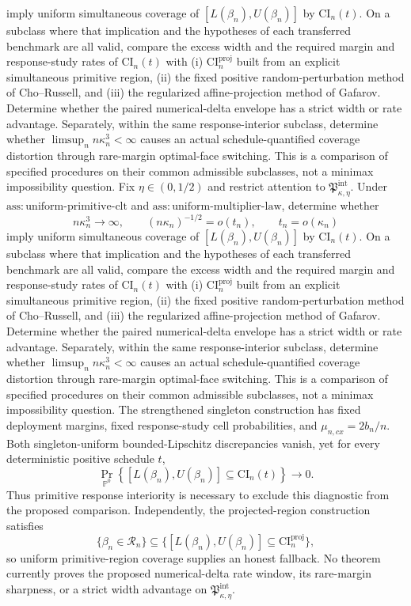 imply uniform simultaneous coverage of \([L(\beta_n),U(\beta_n)]\) by \(\mathrm{CI}_n(t)\).  On a subclass where that implication and the hypotheses of each transferred benchmark are all valid, compare the excess width and the required margin and response-study rates of \(\mathrm{CI}_n(t)\) with (i) \(\mathrm{CI}_n^{\mathrm{proj}}\) built from an explicit simultaneous primitive region, (ii) the fixed positive random-perturbation method of Cho--Russell, and (iii) the regularized affine-projection method of Gafarov.  Determine whether the paired numerical-delta envelope has a strict width or rate advantage.  Separately, within the same response-interior subclass, determine whether \(\limsup_n n\kappa_n^3<\infty\) causes an actual schedule-quantified coverage distortion through rare-margin optimal-face switching.  This is a comparison of specified procedures on their common admissible subclasses, not a minimax impossibility question.
Fix \(\eta\in(0,1/2)\) and restrict attention to \(\mathfrak P_{\kappa,\eta}^{\mathrm{int}}\).  Under \(\mathrm{ass:uniform\text{-}primitive\text{-}clt}\) and \(\mathrm{ass:uniform\text{-}multiplier\text{-}law}\), determine whether
\[
n\kappa_n^3\to\infty,
\qquad
(n\kappa_n)^{-1/2}=o(t_n),
\qquad
t_n=o(\kappa_n)
\]
imply uniform simultaneous coverage of \([L(\beta_n),U(\beta_n)]\) by \(\mathrm{CI}_n(t)\).  On a subclass where that implication and the hypotheses of each transferred benchmark are all valid, compare the excess width and the required margin and response-study rates of \(\mathrm{CI}_n(t)\) with (i) \(\mathrm{CI}_n^{\mathrm{proj}}\) built from an explicit simultaneous primitive region, (ii) the fixed positive random-perturbation method of Cho--Russell, and (iii) the regularized affine-projection method of Gafarov.  Determine whether the paired numerical-delta envelope has a strict width or rate advantage.  Separately, within the same response-interior subclass, determine whether \(\limsup_n n\kappa_n^3<\infty\) causes an actual schedule-quantified coverage distortion through rare-margin optimal-face switching.  This is a comparison of specified procedures on their common admissible subclasses, not a minimax impossibility question.
The strengthened singleton construction has fixed deployment margins, fixed response-study cell probabilities, and \(\mu_{n,cx}=2b_n/n\).  Both singleton-uniform bounded-Lipschitz discrepancies vanish, yet for every deterministic positive schedule \(t\),
\[
\Pr_{\mathbb P^0}\!\left\{[L(\beta_n),U(\beta_n)]\subseteq\mathrm{CI}_n(t)\right\}\longrightarrow0.
\]
Thus primitive response interiority is necessary to exclude this diagnostic from the proposed comparison.  Independently, the projected-region construction satisfies
\[
\{\beta_n\in\mathcal R_n\}
\subseteq
\{[L(\beta_n),U(\beta_n)]\subseteq\mathrm{CI}_n^{\mathrm{proj}}\},
\]
so uniform primitive-region coverage supplies an honest fallback.  No theorem currently proves the proposed numerical-delta rate window, its rare-margin sharpness, or a strict width advantage on \(\mathfrak P_{\kappa,\eta}^{\mathrm{int}}\).
